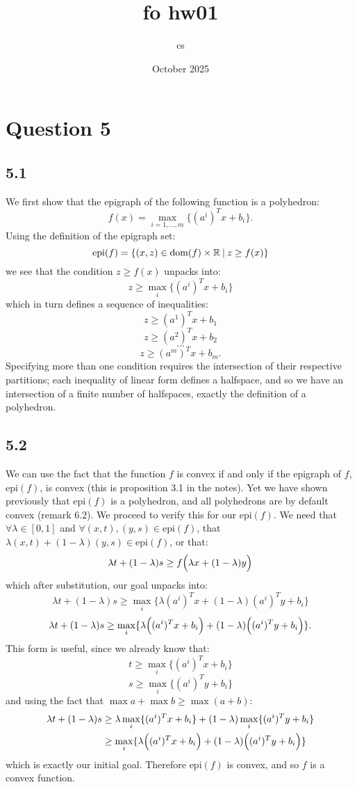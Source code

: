 \documentclass{article}
\title{fo hw01}
\author{cs}
\date{October 2025}
\begin{document}
\maketitle

\section{Question 5}

\subsection{5.1}
We first show that the epigraph of the following function is a polyhedron:
$$f(x)=\max_{i=1,\dots,m}\{(a^i)^T x+b_i\}.$$
Using the definition of the epigraph set:
$$\text{epi}(f)
=\{(x,z)\in\text{dom}(f)\times
\mathbb{R}\hspace{0.03in}|\hspace{0.03in}z\geq f(x)\}$$
we see that the condition $z\geq f(x)$ unpacks into:
$$z\geq\max_i\{(a^i)^T x+b_i\}$$
which in turn defines a sequence of inequalities:
$$z\geq(a^1)^T x+b_1$$
$$z\geq(a^2)^T x+b_2$$
$$\dots$$
$$z\geq(a^m)^T x+b_m.$$
Specifying more than one condition requires the intersection of their respective
partitions; each inequality of linear form defines a halfspace, and so we have an
intersection of a finite number of halfspaces, exactly the definition of a
polyhedron.

\subsection{5.2}
We can use the fact that the function $f$ is convex if and only if the epigraph
of $f$, $\text{epi}(f)$, is convex (this is proposition 3.1 in the notes). Yet
we have shown previously that $\text{epi}(f)$ is a polyhedron, and all 
polyhedrons are by default convex (remark 6.2). We proceed to verify this for our
$\text{epi}(f)$. We need that $\forall\lambda\in[0,1]$ and
$\forall (x,t),(y,s)\in\text{epi}(f)$, that
$\lambda(x,t)+(1-\lambda)(y,s)\in\text{epi}(f)$, or that:
$$\lambda t+(1-\lambda)s\geq f\Bigl(\lambda x+(1-\lambda)y\Bigr)$$
which after substitution, our goal unpacks into:
$$\lambda t+(1-\lambda)s\geq
\max_i\{\lambda(a^i)^T x+(1-\lambda)(a^i)^T y+b_i\}$$
$$\lambda t+(1-\lambda)s\geq
\max_i\{\lambda\Bigl((a^i)^T x+b_i\Bigr)+
(1-\lambda)\Bigl((a^i)^T y+b_i\Bigr)\}.$$
This form is useful, since we already know that:
$$t\geq\max_i\{(a^i)^T x+b_i\}$$
$$s\geq\max_i\{(a^i)^T y+b_i\}$$
and using the fact that $\max{a}+\max{b}\geq\max{(a+b)}$:
\begin{align*}
    \lambda t+(1-\lambda)s
    &\geq\lambda\max_i\{(a^i)^T x+b_i\}+(1-\lambda)\max_i\{(a^i)^T y+b_i\} \\
    &\geq\max_i\{\lambda\Bigl((a^i)^T x+b_i\Bigr)+
    (1-\lambda)\Bigl((a^i)^T y+b_i\Bigr)\}
\end{align*}
which is exactly our initial goal. Therefore $\text{epi}(f)$ is convex, and so
$f$ is a convex function.
\end{document}

